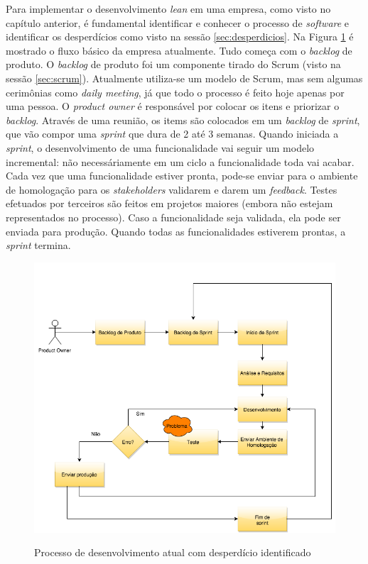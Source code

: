 Para implementar o desenvolvimento \textit{lean} em uma empresa, como visto no capítulo anterior, é fundamental identificar e conhecer o processo de \textit{software} e identificar os desperdícios como visto na sessão \ref{sec:desperdicios}. Na Figura \ref{fig:processo_atual} é mostrado o fluxo básico da empresa atualmente. Tudo começa com o \textit{backlog} de produto. O \textit{backlog} de produto foi um componente tirado do Scrum (visto na sessão \ref{sec:scrum}). Atualmente utiliza-se um modelo de Scrum, mas sem algumas cerimônias como \textit{daily meeting}, já que todo o processo é feito hoje apenas por uma pessoa. O \textit{product owner} é responsável por colocar os itens e priorizar o \textit{backlog}. Através de uma reunião, os items são colocados em um \textit{backlog} de \textit{sprint}, que vão compor uma \textit{sprint} que dura de 2 até 3 semanas. Quando iniciada a \textit{sprint}, o desenvolvimento de uma funcionalidade vai seguir um modelo incremental: não necessáriamente em um ciclo a funcionalidade toda vai acabar. Cada vez que uma funcionalidade estiver pronta, pode-se enviar para o ambiente de homologação para os \textit{stakeholders} validarem e darem um \textit{feedback}. Testes efetuados por terceiros são feitos em projetos maiores (embora não estejam representados no processo). Caso a funcionalidade seja validada, ela pode ser enviada para produção. Quando todas as funcionalidades estiverem prontas, a \textit{sprint} termina.

\begin{figure}[htb!]
\begin{center}
\caption{Processo de desenvolvimento atual com desperdício identificado}
\label{fig:processo_atual}
\includegraphics[width=12cm]{assets/compreender_problema} \\
\end{center}
\end{figure}


